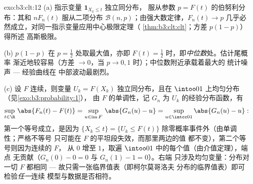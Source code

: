 \begin{solution}{exo:b3:clt:12}
(a) 指示变量 $\mathbf 1_{X_k \leq t}$ 独立同分布，
服从参数 $p = F(t)$ 的伯努利分布：其和 $nF_n(t)$
服从二项分布 $\mathcal B(n, p)$；由强大数定律，$F_n(t)
\to p$ 几乎必然成立，对同一指示变量应用中心极限定理（
\cref{thm:b3:clt:clt}；方差 $p(1-p)$）得所述
高斯极限。

(b) $p(1 - p)$ 在 $p = \frac12$ 处取最大值，亦即
$F(t) = \frac12$ 时，即\emph{中位数}处。估计尾概率
渐近地较容易（方差 $\to 0$，当
$p \to 0, 1$ 时）；中位数附近承载着最大的
统计噪声 --- 经验曲线在
中部波动最剧烈。

(c) 设 $F$ 连续，则变量 $U_k = F(X_k)$
独立同分布，且在 $\intoo01$ 上均匀分布（见\cref{exo:b3:probability:1}），
由 $F$ 的单调性，记 $G_n$ 为
$U_k$ 的经验分布函数，有
\[
\sup_{t\in\R}\,\abs{F_n(t) - F(t)}
= \sup_{u \in \operatorname{im}F}\,\abs{G_n(u) - u}
= \sup_{u\in\intcc01}\abs{G_n(u) - u} :
\]
第一个等号成立，是因为 $\{X_k \leq t\} = \{U_k \leq
F(t)\}$ 除零概率事件外（由单调性；严格不等号
只可能在 $F$ 的平坦段失效，而那里两边的值
都不变），第二个等号则因为连续的 $F$，
从 $0$ 增至 $1$，取遍
$\intoo01$ 中的每个值（由介值定理），端点
无贡献（$G_n(0) - 0 = 0$ 与 $G_n(1) - 1 = 0$）。右端
只涉及均匀变量：分布对一切
$F$ 都相同 --- 故只需一张临界值表（即柯尔莫哥洛夫
分布的临界值表）即可检验\emph{任一}连续
模型与数据是否相符。
\end{solution}

